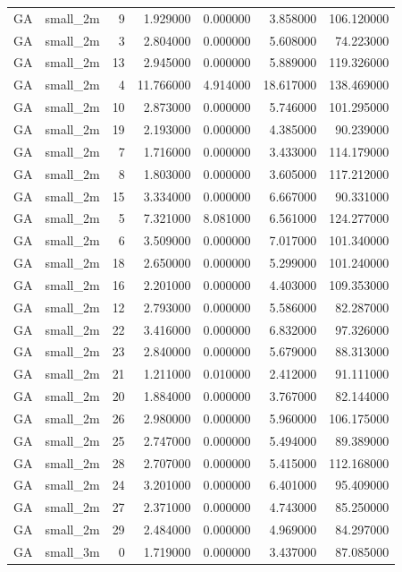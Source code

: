 \begin{tabular}{llrrrrr}
GA & small_2m & 9 & 1.929000 & 0.000000 & 3.858000 & 106.120000 \\
GA & small_2m & 3 & 2.804000 & 0.000000 & 5.608000 & 74.223000 \\
GA & small_2m & 13 & 2.945000 & 0.000000 & 5.889000 & 119.326000 \\
GA & small_2m & 4 & 11.766000 & 4.914000 & 18.617000 & 138.469000 \\
GA & small_2m & 10 & 2.873000 & 0.000000 & 5.746000 & 101.295000 \\
GA & small_2m & 19 & 2.193000 & 0.000000 & 4.385000 & 90.239000 \\
GA & small_2m & 7 & 1.716000 & 0.000000 & 3.433000 & 114.179000 \\
GA & small_2m & 8 & 1.803000 & 0.000000 & 3.605000 & 117.212000 \\
GA & small_2m & 15 & 3.334000 & 0.000000 & 6.667000 & 90.331000 \\
GA & small_2m & 5 & 7.321000 & 8.081000 & 6.561000 & 124.277000 \\
GA & small_2m & 6 & 3.509000 & 0.000000 & 7.017000 & 101.340000 \\
GA & small_2m & 18 & 2.650000 & 0.000000 & 5.299000 & 101.240000 \\
GA & small_2m & 16 & 2.201000 & 0.000000 & 4.403000 & 109.353000 \\
GA & small_2m & 12 & 2.793000 & 0.000000 & 5.586000 & 82.287000 \\
GA & small_2m & 22 & 3.416000 & 0.000000 & 6.832000 & 97.326000 \\
GA & small_2m & 23 & 2.840000 & 0.000000 & 5.679000 & 88.313000 \\
GA & small_2m & 21 & 1.211000 & 0.010000 & 2.412000 & 91.111000 \\
GA & small_2m & 20 & 1.884000 & 0.000000 & 3.767000 & 82.144000 \\
GA & small_2m & 26 & 2.980000 & 0.000000 & 5.960000 & 106.175000 \\
GA & small_2m & 25 & 2.747000 & 0.000000 & 5.494000 & 89.389000 \\
GA & small_2m & 28 & 2.707000 & 0.000000 & 5.415000 & 112.168000 \\
GA & small_2m & 24 & 3.201000 & 0.000000 & 6.401000 & 95.409000 \\
GA & small_2m & 27 & 2.371000 & 0.000000 & 4.743000 & 85.250000 \\
GA & small_2m & 29 & 2.484000 & 0.000000 & 4.969000 & 84.297000 \\
GA & small_3m & 0 & 1.719000 & 0.000000 & 3.437000 & 87.085000 \\

\end{tabular}
